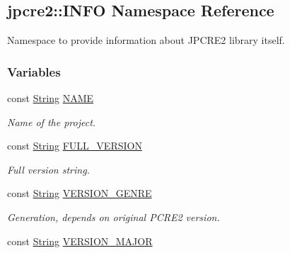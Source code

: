 \hypertarget{namespacejpcre2_1_1INFO}{}\subsection{jpcre2\+:\+:I\+N\+FO Namespace Reference}
\label{namespacejpcre2_1_1INFO}


Namespace to provide information about J\+P\+C\+R\+E2 library itself.  


\subsubsection*{Variables}
\begin{DoxyCompactItemize}
\item 
const \hyperlink{namespacejpcre2_a91f03070152fb228bc116c5a737f1d16}{String} \hyperlink{namespacejpcre2_1_1INFO_a0d5716a82b496f2ccf5eee832275b4b8}{N\+A\+ME}
\begin{DoxyCompactList}\small\item\em Name of the project. \end{DoxyCompactList}\item 
const \hyperlink{namespacejpcre2_a91f03070152fb228bc116c5a737f1d16}{String} \hyperlink{namespacejpcre2_1_1INFO_a315fc58da1463f4d1cc417677bd31ca1}{F\+U\+L\+L\+\_\+\+V\+E\+R\+S\+I\+ON}\hypertarget{namespacejpcre2_1_1INFO_a315fc58da1463f4d1cc417677bd31ca1}{}\label{namespacejpcre2_1_1INFO_a315fc58da1463f4d1cc417677bd31ca1}

\begin{DoxyCompactList}\small\item\em Full version string. \end{DoxyCompactList}\item 
const \hyperlink{namespacejpcre2_a91f03070152fb228bc116c5a737f1d16}{String} \hyperlink{namespacejpcre2_1_1INFO_a9d046526610d624eaaa04b5fb000e48f}{V\+E\+R\+S\+I\+O\+N\+\_\+\+G\+E\+N\+RE}\hypertarget{namespacejpcre2_1_1INFO_a9d046526610d624eaaa04b5fb000e48f}{}\label{namespacejpcre2_1_1INFO_a9d046526610d624eaaa04b5fb000e48f}

\begin{DoxyCompactList}\small\item\em Generation, depends on original P\+C\+R\+E2 version. \end{DoxyCompactList}\item 
const \hyperlink{namespacejpcre2_a91f03070152fb228bc116c5a737f1d16}{String} \hyperlink{namespacejpcre2_1_1INFO_a5deb805502c30063a5a68d91bf034d86}{V\+E\+R\+S\+I\+O\+N\+\_\+\+M\+A\+J\+OR}\hypertarget{namespacejpcre2_1_1INFO_a5deb805502c30063a5a68d91bf034d86}{}\label{namespacejpcre2_1_1INFO_a5deb805502c30063a5a68d91bf034d86}


\end{DoxyCompactItemize}
